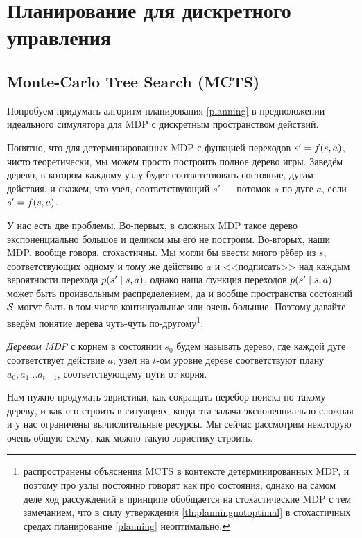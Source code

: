 \section{Планирование для дискретного управления}\label{mctssection}

\subsection{Monte-Carlo Tree Search (MCTS)}

Попробуем придумать алгоритм планирования \eqref{planning} в предположении идеального симулятора для MDP с дискретным пространством действий.

Понятно, что для детерминированных MDP с функцией переходов $s' \HM= f(s, a)$, чисто теоретически, мы можем просто построить полное дерево игры. Заведём дерево, в котором каждому узлу будет соответствовать состояние, дугам --- действия, и скажем, что узел, соответствующий $s'$ --- потомок $s$ по дуге $a$, если $s' \HM= f(s, a)$.

У нас есть две проблемы. Во-первых, в сложных MDP такое дерево экспоненциально большое и целиком мы его не построим. Во-вторых, наши MDP, вообще говоря, стохастичны. Мы могли бы ввести много рёбер из $s$, соответствующих одному и тому же действию $a$ и <<подписать>> над каждым вероятности перехода $p(s' \HM\mid s, a)$, однако наша функция переходов $p(s' \HM\mid s, a)$ может быть произвольным распределением, да и вообще пространства состояний $\mathcal{S}$ могут быть в том числе континуальные или очень большие. Поэтому давайте введём понятие дерева чуть-чуть по-другому\footnote{распространены объяснения MCTS в контексте детерминированных MDP, и поэтому про узлы постоянно говорят как про состояния; однако на самом деле ход рассуждений в принципе обобщается на стохастические MDP с тем замечанием, что в силу утверждения \ref{th:planningnotoptimal} в стохастичных средах планирование \eqref{planning} неоптимально.}:

\begin{definition}
\emph{Деревом MDP} с корнем в состоянии $s_0$ будем называть дерево, где каждой дуге соответствует действие $a$; узел на $t$-ом уровне дереве соответствуют плану $a_0, a_1 \dots a_{t-1}$, соответствующему пути от корня.
\end{definition}

Нам нужно продумать эвристики, как сокращать перебор поиска по такому дереву, и как его строить в ситуациях, когда эта задача экспоненциально сложная и у нас ограничены вычислительные ресурсы. Мы сейчас рассмотрим некоторую очень общую схему, как можно такую эвристику строить.

